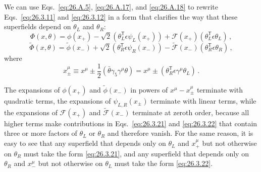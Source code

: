 We can use Eqs.~\eqref{eq:26.A.5}, \eqref{eq:26.A.17}, and
\eqref{eq:26.A.18} to rewrite Eqs.~\eqref{eq:26.3.11} and
\eqref{eq:26.3.12} in a form that clarifies the way that these superfields
depend on $\theta_L$ and $\theta_R$:
\begin{equation}
  \Phi(x,\theta)
  =\phi(x_+)-\sqrt{2}(\theta_L^{\mathsf T}\epsilon\psi_L(x_+))
  +\mathcal{F}(x_+)(\theta_L^{\mathsf T}\epsilon\theta_L)\,,
  \tag{26.3.21}\label{eq:26.3.21}
\end{equation}
\begin{equation}
  \widetilde{\Phi}(x,\theta)
  =\widetilde{\phi}(x_-)+\sqrt{2}(\theta_R^{\mathsf T}\epsilon\psi_R(x_-))
  -\widetilde{\mathcal{F}}(x_-)(\theta_R^{\mathsf T}\epsilon\theta_R)\,,
  \tag{26.3.22}\label{eq:26.3.22}
\end{equation}
where
\begin{equation}
  x_\pm^\mu\equiv x^\mu
  \pm\frac12(\bar\theta\gamma_5\gamma^\mu\theta)
  =x^\mu\pm(\theta_R^{\mathsf T}\epsilon\gamma^\mu\theta_L)\,.
  \tag{26.3.23}\label{eq:26.3.23}
\end{equation}

The expansions of $\phi(x_+)$ and $\widetilde{\phi}(x_-)$ in powers of
$x^\mu-x_\pm^\mu$ terminate with quadratic terms, the expansions of
$\psi_{L,R}(x_\pm)$ terminate with linear terms, while the expansions of
$\mathcal{F}(x_+)$ and $\widetilde{\mathcal{F}}(x_-)$ terminate at zeroth
order, because all higher terms make contributions in
Eqs.~\eqref{eq:26.3.21} and \eqref{eq:26.3.22} that contain three or more
factors of $\theta_L$ or $\theta_R$ and therefore vanish. For the same reason,
it is easy to see that any superfield that depends only on $\theta_L$ and
$x_+^\mu$ but not otherwise on $\theta_R$ must take the form
\eqref{eq:26.3.21}, and any superfield that depends only on $\theta_R$ and
$x_-^\mu$ but not otherwise on $\theta_L$ must take the form
\eqref{eq:26.3.22}.

